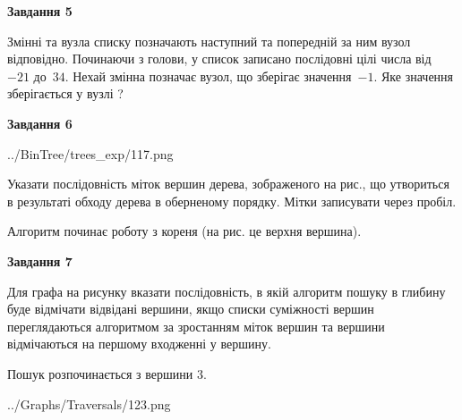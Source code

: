 \documentclass[12pt, ukrainian]{article}
\begin{document}
{\begin {large}
{\begin {center}\textbf{Завдання 5}\end {center}}\par
Змінні  та  вузла списку позначають наступний та попередній за ним вузол відповідно. Починаючи з голови, у список записано послідовні цілі числа від~$-21$ до~$34$. Нехай змінна  позначає вузол, що зберігає значення~$-1$.
Яке значення зберігається у вузлі  ?\par
\newpage

{\begin {center}\textbf{Завдання 6}\end {center}}\par

\begin{center}
	{../BinTree/trees_exp/117.png}
\end{center}
Указати послідовність міток вершин дерева, зображеного на рис., що утвориться в результаті обходу дерева в оберненому порядку. Мітки записувати через пробіл.\par Алгоритм починає роботу з кореня (на рис. це верхня вершина).\par
\newpage

{\begin {center}\textbf{Завдання 7}\end {center}}\par
Для графа на рисунку вказати послідовність, в якій алгоритм пошуку в глибину буде відмічати відвідані вершини, якщо списки суміжності вершин переглядаються алгоритмом за зростанням міток вершин та вершини відмічаються на першому вход\-женні у вершину.\par
Пошук розпочинається з вершини 3.\par

\begin{center}
	{../Graphs/Traversals/123.png}
\end{center}\par
\newpage


\end{large}}
\end{document}
